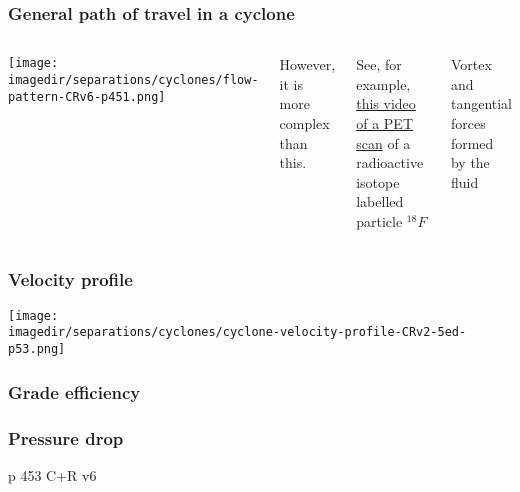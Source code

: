 \begin{frame}\frametitle{General path of travel in a cyclone}
	\begin{columns}[c]
			\begin{center}
				\texttt{[image: \\imagedir/separations/cyclones/flow-pattern-CRv6-p451.png]}
			\end{center}
			However, it is more complex than this. 
			
			See, for example, \href{http://www.youtube.com/watch?v=CWLARs\_dJO0}{this video of a PET scan} of a radioactive isotope labelled particle $^{18}F$
			
			\vspace{12pt}
			Vortex and tangential forces formed by the fluid
	\end{columns}
\end{frame}

\begin{frame}\frametitle{Velocity profile}
	\begin{center}
		\texttt{[image: \\imagedir/separations/cyclones/cyclone-velocity-profile-CRv2-5ed-p53.png]}
	\end{center}
\end{frame}

\begin{frame}\frametitle{Grade efficiency}
	
\end{frame}

\begin{frame}\frametitle{Pressure drop}
	p 453 C+R v6
\end{frame}

